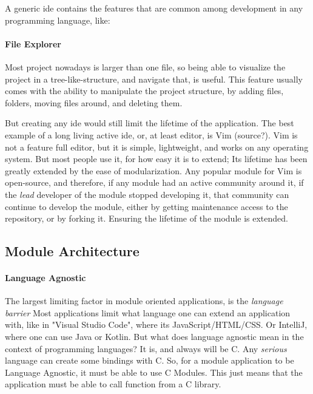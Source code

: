 A generic \gls{ide} contains the features that are common among development in
any programming language, like:

\paragraph{File Explorer} Most project nowadays is larger than one file, so
being able to visualize the project in a tree-like-structure, and navigate that,
is useful. This feature usually comes with the ability to manipulate the project
structure, by adding files, folders, moving files around, and deleting them.

But creating any \gls{ide} would still limit the lifetime of the application.
The best example of a long living active \gls{ide}, or, at least editor, is Vim
(source?). Vim is not a feature full editor, but it is simple, lightweight, and
works on any operating system. But most people use it, for how easy it is to
extend; Its lifetime has been greatly extended by the ease of modularization.
Any popular module for Vim is open-source, and therefore, if any module had an
active community around it, if the \textit{lead} developer of the module stopped
developing it, that community can continue to develop the module, either by
getting maintenance access to the repository, or by forking it. Ensuring the
lifetime of the module is extended.

\subsection{Module Architecture}


\paragraph{Language Agnostic} The largest limiting factor in module oriented
applications, is the \textit{language barrier} Most applications limit what
language one can extend an application with, like in "Visual Studio Code", where
its JavaScript/HTML/CSS. Or IntelliJ, where one can use Java or Kotlin. But what
does language agnostic mean in the context of programming languages? It is, and
always will be C. Any \textit{serious} language can create some bindings with C.
So, for a module application to be Language Agnostic, it must be able to use C
Modules. This just means that the application must be able to call function from
a C library.

